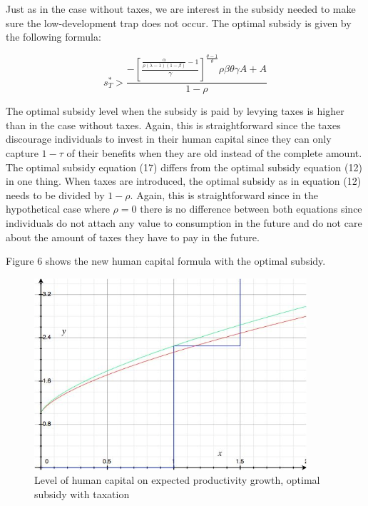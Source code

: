 \documentclass[a4paper,11pt]{article} %
\begin{document}
Just as in the case without taxes, we are interest in the subsidy needed to make sure the low-development trap does not occur. The optimal subsidy is given by the following formula:

\begin{equation}
  s^*_T > \frac{
    - \left[\frac{
        \frac{\alpha}{\rho(\lambda-1)(1-\beta)}-1
      }{\gamma} \right]
    ^{\frac{\theta-1}{\theta}} \rho\beta\theta\gamma A + A
  }{1-\rho}
\end{equation}

The optimal subsidy level when the subsidy is paid by levying taxes is higher than in the case without taxes. Again, this is straightforward since the taxes discourage individuals to invest in their human capital since they can only capture \(1-\tau\) of their benefits when they are old instead of the complete amount. The optimal subsidy equation (17) differs from the optimal subsidy equation (12) in one thing. When taxes are introduced, the optimal subsidy as in equation (12) needs to be divided by \(1-\rho\). Again, this is straightforward since in the hypothetical case where \(\rho=0\) there is no difference between both equations since individuals do not attach any value to consumption in the future and do not care about the amount of taxes they have to pay in the future. 

Figure 6 shows the new human capital formula with the optimal subsidy. 

\begin{figure}
  \centering
  \includegraphics[width=0.9\textwidth]{figure6.png}
  \caption{Level of human capital on expected productivity growth, optimal subsidy with taxation}
\end{figure}
\end{document}
